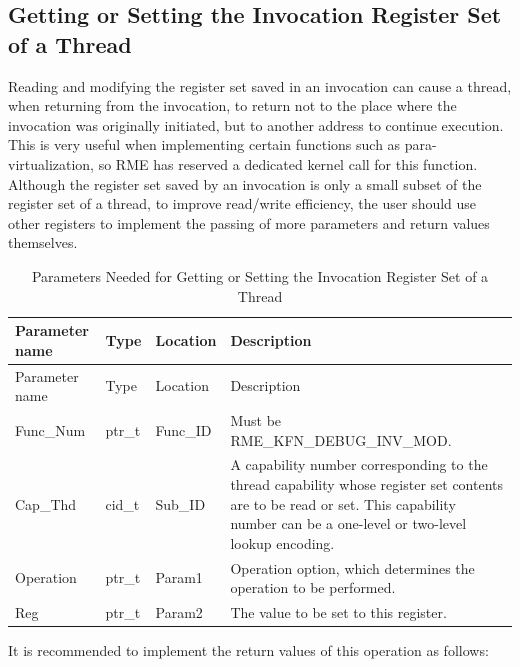\subsection{Getting or Setting the Invocation Register Set of a Thread}\label{subsec:8-get-or-set-thread-migration-call-register-set}

Reading and modifying the register set saved in an invocation can cause a thread, when returning from the invocation, to return not to the place where the invocation was originally initiated, but to another address to continue execution. This is very useful when implementing certain functions such as para-virtualization, so RME has reserved a dedicated kernel call for this function. Although the register set saved by an invocation is only a small subset of the register set of a thread, to improve read/write efficiency, the user should use other registers to implement the passing of more parameters and return values themselves.

\begin{xltabular}{\textwidth}{@{}>{\hsize\raggedright\arraybackslash}X>{\hsize\raggedright\arraybackslash}X>{\hsize\raggedright\arraybackslash}X>{\hsize\raggedright\arraybackslash}X@{}}
\caption{Parameters Needed for Getting or Setting the Invocation Register Set of a Thread}\label{tab:8-113-get-or-set-thread-migration-call-register-set-parameters}\\
\toprule
Parameter name & Type & Location & Description\tabularnewline
\endfirsthead
\toprule
Parameter name & Type & Location & Description\tabularnewline
\midrule
\endhead
\bottomrule
\endlastfoot
Func\_Num & ptr\_t & Func\_ID & Must be RME\_KFN\_DEBUG\_INV\_MOD.\tabularnewline
Cap\_Thd & cid\_t & Sub\_ID &
A capability number corresponding to the thread capability whose register set contents are to be read or set. This capability number can be a one-level or two-level lookup encoding.\tabularnewline
Operation & ptr\_t & Param1 &
Operation option, which determines the operation to be performed.\tabularnewline
Reg & ptr\_t & Param2 & The value to be set to this register.\tabularnewline
\end{xltabular}
\nopagebreak[4]

It is recommended to implement the return values of this operation as follows:

